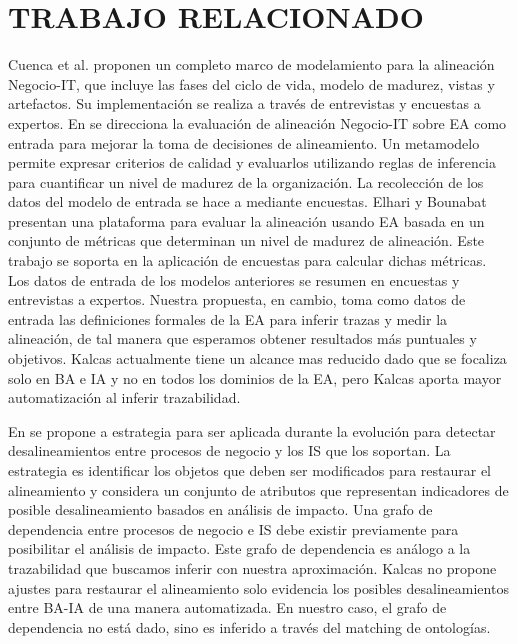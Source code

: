 \chapter{TRABAJO RELACIONADO} \label{cha:relatedwork}

Cuenca et al. \cite{Cuenca:2010} proponen un completo marco de modelamiento para la alineaci\'on Negocio-IT, que incluye las fases del ciclo de vida, modelo de madurez, vistas y artefactos. Su implementaci\'on se realiza a trav\'es de entrevistas y encuestas a expertos. En \cite{Plazaola:2008} se direcciona la evaluaci\'on de alineaci\'on Negocio-IT sobre EA como entrada para mejorar la toma de decisiones de alineamiento. Un metamodelo permite expresar criterios de calidad y evaluarlos utilizando reglas de inferencia para cuantificar un nivel de madurez de la organizaci\'on. La recolecci\'on de los datos del modelo de entrada se hace a mediante encuestas. Elhari y Bounabat \cite{Elhari:2011} presentan una plataforma para evaluar la alineaci\'on usando EA basada en un conjunto de m\'etricas que determinan un nivel de madurez de alineaci\'on. Este trabajo se soporta en la aplicaci\'on de encuestas para calcular dichas m\'etricas. Los datos de entrada de los modelos anteriores se resumen en encuestas y entrevistas a expertos. Nuestra propuesta, en cambio, toma como datos de entrada las definiciones formales de la EA para inferir trazas y medir la alineaci\'on, de tal manera que esperamos obtener resultados m\'as puntuales y objetivos. Kalcas actualmente tiene un alcance mas reducido dado que se focaliza solo en BA e IA y no en todos los dominios de la EA, pero Kalcas aporta mayor automatizaci\'on al inferir trazabilidad. 

En \cite{Aversano:2005} se propone a estrategia para ser aplicada durante la evoluci\'on para detectar desalineamientos entre procesos de negocio y los IS que los soportan. La estrategia es identificar los objetos que deben ser modificados para restaurar el alineamiento y considera un conjunto de atributos que representan indicadores de posible desalineamiento basados en an\'alisis de impacto. Una grafo de dependencia entre procesos de negocio e IS debe existir previamente para posibilitar el an\'alisis de impacto. Este grafo de dependencia es an\'alogo a la trazabilidad que buscamos inferir con nuestra aproximaci\'on. Kalcas no propone ajustes para restaurar el alineamiento solo evidencia los posibles desalineamientos entre BA-IA de una manera automatizada. En nuestro caso, el grafo de dependencia no est\'a dado, sino es inferido a trav\'es del matching de ontolog\'ias.

